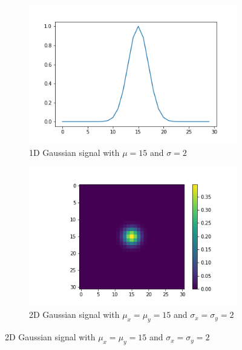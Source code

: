 		\begin{figure}
		    \centering
		    \begin{subfigure}[b]{0.3\textwidth}
		        \includegraphics[width=\textwidth]{graphs/gauss_sigma_2.png}
		        \caption{1D Gaussian signal with $\mu=15$ and $\sigma=2$}
		    \end{subfigure}
		    
		    \begin{subfigure}[b]{0.3\textwidth}
		        \includegraphics[width=\textwidth]{images/gauss_sigma_2.png}
		        \caption{2D Gaussian signal with $\mu_x = \mu_y = 15$ and $\sigma_x = \sigma_y = 2$}
		    \end{subfigure}
		    

\end{figure}
